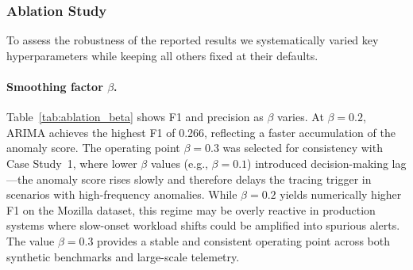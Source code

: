 \documentclass[pdflatex,sn-nature]{sn-jnl}%
\theoremstyle{thmstyleone}%
\theoremstyle{thmstyletwo}%
\theoremstyle{thmstylethree}%
\begin{document}
\begin{table}[tbp]
\centering
{}
\caption{Pairwise Wilcoxon signed-rank test results ($n{=}214$ signatures, $\alpha{=}0.05$). ``sig.'' = statistically significant difference; ``not sig.'' = no significant difference.}
\label{tab:mozilla_wilcoxon}
\end{table}

\subsubsection{Ablation Study}
To assess the robustness of the reported results we systematically varied key hyperparameters while keeping all others fixed at their defaults.

\paragraph{Smoothing factor $\beta$.}
Table~\ref{tab:ablation_beta} shows F1 and precision as $\beta$ varies. At $\beta{=}0.2$, ARIMA achieves the highest F1 of 0.266, reflecting a faster accumulation of the anomaly score. The operating point $\beta{=}0.3$ was selected for consistency with Case Study~1, where lower $\beta$ values (e.g., $\beta{=}0.1$) introduced decision-making lag---the anomaly score rises slowly and therefore delays the tracing trigger in scenarios with high-frequency anomalies. While $\beta{=}0.2$ yields numerically higher F1 on the Mozilla dataset, this regime may be overly reactive in production systems where slow-onset workload shifts could be amplified into spurious alerts. The value $\beta{=}0.3$ provides a stable and consistent operating point across both synthetic benchmarks and large-scale telemetry.
\end{document}

